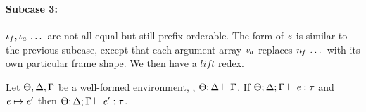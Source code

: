 \begin{sproof}
  \paragraph{Subcase 3:}
  $\mathit{\iota}_f, \mathit{\iota}_a \, \ldots \,$ are not all equal but still prefix orderable.
  The form of $\mathit{e}$ is similar to the previous subcase,
  except that each argument array $\mathit{v}_a$ replaces $\mathit{n}_f \, \ldots \,$
  with its own particular frame shape.
  We then have a $\mathit{lift}$ redex.
\end{sproof}


\begin{lemma}[Preservation]
  \label{Preservation}
  Let $\Theta,\Delta,\Gamma$ be a well-formed environment, \ie, $\Theta ; \Delta \vdash \Gamma$.
  If $\Theta;\Delta;\Gamma \vdash \mathit{e} : \mathit{\tau}$
  and $\mathit{e} \mapsto \mathit{e}'$
  then $\Theta;\Delta;\Gamma \vdash \mathit{e}' : \mathit{\tau}$.
\end{lemma}
